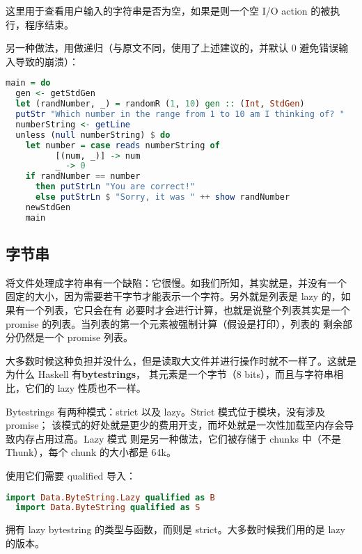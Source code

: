 \documentclass[./main.tex]{subfiles}
\begin{document}
这里用于查看用户输入的字符串是否为空，如果是则一个空 I/O action 的被执行，程序结束。

另一种做法，用做递归（与原文不同，使用了上述建议的，并默认 0 避免错误输入导致的崩溃）：

\begin{lstlisting}[language=Haskell]
  main = do
  gen <- getStdGen
  let (randNumber, _) = randomR (1, 10) gen :: (Int, StdGen)
  putStr "Which number in the range from 1 to 10 am I thinking of? "
  numberString <- getLine
  unless (null numberString) $ do
    let number = case reads numberString of
          [(num, _)] -> num
          _ -> 0
    if randNumber == number
      then putStrLn "You are correct!"
      else putStrLn $ "Sorry, it was " ++ show randNumber
    newStdGen
    main
\end{lstlisting}

\subsection*{字节串}

将文件处理成字符串有一个缺陷：它很慢。如我们所知，其实就是\acode{[Char]}，并没有一个
固定的大小，因为需要若干字节才能表示一个字符。另外就是列表是 lazy 的，如果有一个\acode{[1,2,3,4]}列表，它只会在有
必要时才会进行计算，也就是说整个列表其实是一个 promise 的列表。当列表的第一个元素被强制计算（假设是打印），列表的
剩余部分仍然是一个 promise 列表。

大多数时候这种负担并没什么，但是读取大文件并进行操作时就不一样了。这就是为什么 Haskell 有\textbf{bytestrings}，
其元素是一个字节（8 bits），而且与字符串相比，它们的 lazy 性质也不一样。

Bytestrings 有两种模式：strict 以及 lazy。Strict 模式位于模块，没有涉及 promise；
该模式的好处就是更少的费用开支，而坏处就是一次性加载至内存会导致内存占用过高。Lazy 模式
则是另一种做法，它们被存储于 chunks 中（不是 Thunk），每个 chunk 的大小都是 64k。

使用它们需要 qualified 导入：

\begin{lstlisting}[language=Haskell]
  import Data.ByteString.Lazy qualified as B
  import Data.ByteString qualified as S
\end{lstlisting}

拥有 lazy bytestring 的类型与函数，而则是 strict。大多数时候我们用的是 lazy 的版本。
\end{document}
